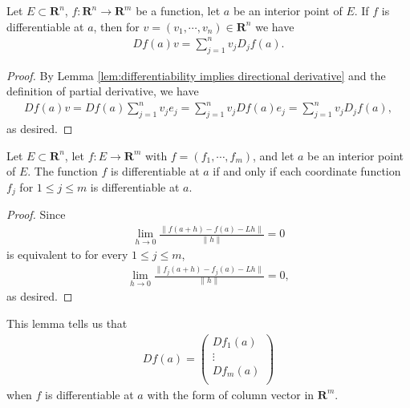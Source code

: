 \begin{corollary}\label{lem:representation of directional derivatives}
    Let $E \subset \mathbf{R}^n$, $f : \mathbf{R}^n \to \mathbf{R}^m$ be a function, let $a$ be an interior point of $E$. If $f$ is differentiable at $a$, then for $v = (v_1, \cdots, v_n) \in \mathbf{R}^n$ we have
    \begin{align*}
        Df(a)v = \sum_{j = 1}^nv_jD_jf(a).
    \end{align*}
\end{corollary}

\begin{proof}
    By Lemma \ref{lem:differentiability implies directional derivative} and the definition of partial derivative, we have
        \begin{align*}
            Df(a)v
            = Df(a)\sum_{j = 1}^nv_je_j
            = \sum_{j = 1}^nv_jDf(a)e_j
            = \sum_{j = 1}^nv_jD_jf(a),
        \end{align*}
    as desired.
\end{proof}


\begin{lemma}\label{lem:derivative of coordinate function}
    Let $E \subset \mathbf{R}^n$, let $f : E \to \mathbf{R}^m$ with $f = (f_1, \cdots, f_m)$, and let $a$ be an interior point of $E$. The function $f$ is differentiable at $a$ if and only if each coordinate function $f_j$ for $1 \leq j \leq m$ is differentiable at $a$.
\end{lemma}

\begin{proof}
    Since
        \begin{align*}
            \lim_{h \to 0}\frac{\|f(a + h) - f(a) - Lh\|}{\|h\|} = 0
        \end{align*}
    is equivalent to for every $1 \leq j \leq m$,
        \begin{align*}
            \lim_{h \to 0}\frac{\|f_j(a + h) - f_j(a) - Lh\|}{\|h\|} = 0,
        \end{align*}
    as desired.
\end{proof}

\begin{remark}
    This lemma tells us that
    \begin{align*}
        Df(a) = \left(\begin{matrix}
            Df_1(a)\\
            \vdots\\
            Df_m(a)\\
        \end{matrix}\right)
    \end{align*}
when $f$ is differentiable at $a$ with the form of column vector in $\mathbf{R}^m$.
\end{remark}


